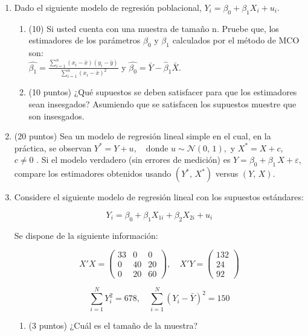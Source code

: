 \documentclass[10pt,a4paper]{article}
\begin{document}
\begin{enumerate}
    \item   Dado el siguiente modelo de regresión poblacional, $Y_i = \beta_0 + \beta_1 X_i + u_i$.
    \begin{enumerate}
        \item (10) Si usted cuenta con una muestra de tamaño n. Pruebe que, los estimadores de los parámetros $\beta_0$ y $\beta_1$ calculados por el m\'etodo de  MCO son:\\
        $\hat{\beta_1}=\frac{\sum_{i=1}^{n}(x_i - \bar{x})(y_i-\bar{y})}{\sum_{i=1}^{n}(x_i - \bar{x})^2}$ y  $\hat{\beta_0}=\bar{Y}-\hat{\beta}_1\bar{X}$.
       \item (10 puntos)	¿Qu\'e supuestos se deben satisfacer para que los estimadores  sean insesgados? Asumiendo que se satisfacen los supuestos muestre que son insesgados. \end{enumerate}
     \item (20 puntos) Sea un modelo de regresión lineal simple en el cual, en la práctica, se observan $
Y^* = Y + u, \quad \text{donde } u \sim \mathcal{N}(0,\,1),
$ y $
X^* = X + c$, \quad {} $c \neq 0$ . Si el modelo verdadero (sin errores de medición) es $
Y = \beta_0 + \beta_1 \, X + \varepsilon$, compare los estimadores obtenidos  usando \((Y^*,\,X^*)\) versus  \((Y,\,X)\).
    \item Considere el siguiente modelo de regresión lineal con los supuestos estándares:

    \[
    Y_i = \beta_0 + \beta_1 X_{1i} + \beta_2 X_{2i} + u_i
    \]
    
    Se dispone de la siguiente información:
    
    \[
    X'X = \begin{pmatrix}
    33 & 0 & 0 \\
    0 & 40 & 20 \\
    0 & 20 & 60
    \end{pmatrix}, \quad
    X'Y = \begin{pmatrix}
    132 \\
    24 \\
    92
    \end{pmatrix}
    \]
    
    \[
    \sum_{i=1}^{N} Y_i^2 = 678, \quad \sum_{i=1}^{N} (Y_i - \bar{Y})^2 = 150
    \]

    \begin{enumerate}
        \item (3 puntos) ¿Cuál es el tamaño de la muestra?\\
    

\end{enumerate}
\end{enumerate}
\end{document}

